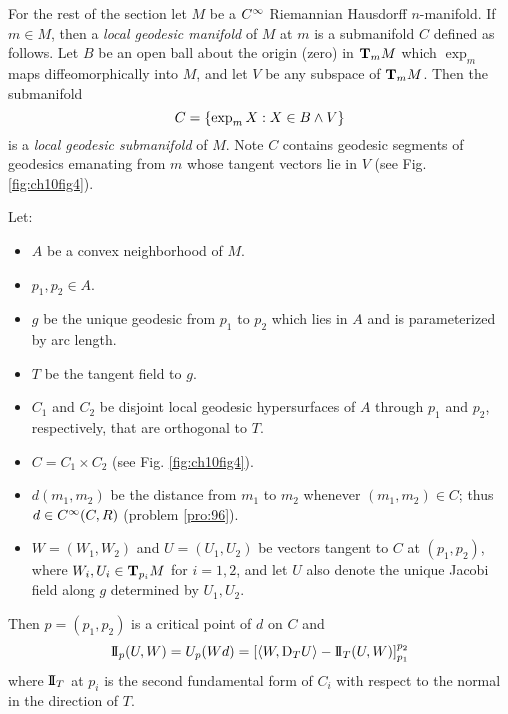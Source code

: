 \documentclass[../main]{subfiles}
\begin{document}
For the rest of the section let $M$ be a $\CInfty$ Riemannian Hausdorff $n$-manifold. If $m\in M$, then a \emph{local geodesic manifold} of $M$ at $m$ is a submanifold $C$ defined as follows. Let $B$ be an open ball about the origin (zero) in $\ts Mm$ which $\exp_m$ maps diffeomorphically into $M$, and let $V$ be any subspace of $\ts Mm$. Then the submanifold
\[C = \brc{\exp_mX: X\in B\wedge V}\]
is a \emph{local geodesic submanifold} of $M$. Note $C$ contains geodesic segments of geodesics emanating from $m$ whose tangent vectors lie in $V$ (see Fig. \ref{fig:ch10fig4}).



\begin{lemma} \label{lem:ch10.4.1}
Let:
\begin{itemize}
    \item $A$ be a convex neighborhood of $M$.
    \item $p_1,p_2\in A$.
    \item $g$ be the unique geodesic from $p_1$ to $p_2$ which lies in $A$ and is parameterized by arc length.
    \item $T$ be the tangent field to $g$.
    \item $C_1$ and $C_2$ be disjoint local geodesic hypersurfaces of $A$ through $p_1$ and $p_2$, respectively, that are orthogonal to $T$.
    \item $C=C_1\times C_2$ (see Fig. \ref{fig:ch10fig4}).
    \item $d(m_1,m_2)$ be the distance from $m_1$ to $m_2$ whenever $(m_1,m_2)\in C$; thus $d\in\CInfty(C,R)$ (problem \ref{pro:96}).
    \item $W=(W_1,W_2)$ and $U=(U_1,U_2)$ be vectors tangent to $C$ at $(p_1,p_2)$, where $W_i,U_i\in\ts{M}{p_i}$ for $i=1,2$, and let $U$ also denote the unique Jacobi field along $g$ determined by $U_1,U_2$.
\end{itemize}
Then $p=(p_1,p_2)$ is a critical point of $d$ on $C$ and
\[\secondForm_p(U,W) = U_p(Wd) = \sbr{\ip{W}{\D_TU} - \secondForm_T(U,W)}_{p_1}^{p_2}\]
where $\secondForm_T$ at $p_i$ is the second fundamental form of $C_i$ with respect to the normal in the direction of $T$.
\end{lemma}

\end{document}
